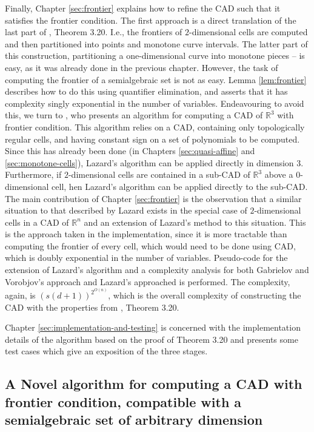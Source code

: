 \documentclass[
]{book}
\theoremstyle{definition}
\theoremstyle{definition}
\theoremstyle{definition}
\theoremstyle{definition}
\theoremstyle{remark}
\begin{document}
Finally, Chapter \ref{sec:frontier} explains how to refine the CAD such that it satisfies the frontier condition. The
first approach is a direct translation of the last part of \citet{bgv15}, Theorem 3.20. I.e., the frontiers of \(2\)-dimensional
cells are computed and then partitioned into points and monotone curve intervals. The latter part of this construction,
partitioning a one-dimensional curve into monotone pieces -- is easy, as it was already done in the previous chapter.
However, the task of computing the frontier of a semialgebraic set is not as easy. Lemma \ref{lem:frontier} describes how to do this using quantifier elimination, and asserts that it has complexity singly exponential in the number of variables.
Endeavouring to avoid this, we turn to \citet{lazard10}, who presents an algorithm for computing a CAD of \(\mathbb{R}^3\) with frontier condition. This algorithm relies on a CAD, containing only topologically regular cells, and having constant sign on a set of polynomials to be computed. Since this has already been done (in Chapters \ref{sec:quasi-affine} and \ref{sec:monotone-cells}), Lazard's algorithm can be applied directly in dimension \(3\). Furthermore, if \(2\)-dimensional cells are contained in a sub-CAD of \(\mathbb{R}^3\) above a \(0\)-dimensional cell, hen Lazard's algorithm can be applied directly to the sub-CAD.
The main contribution of Chapter \ref{sec:frontier} is the observation that a similar situation to that described by Lazard exists in the special case of \(2\)-dimensional cells in a CAD of \(\mathbb{R}^n\) and an extension of Lazard's method to this situation.
This is the approach taken in the implementation, since it is more tractable than computing the frontier of every cell, which would need to be done using CAD, which is doubly exponential in the number of variables.
Pseudo-code for the extension of Lazard's algorithm and a complexity analysis for both Gabrielov and Vorobjov's approach and Lazard's approached is performed. The complexity, again, is \(\left(s (d+1)\right)^{2^{O(n)}}\), which is the overall complexity of constructing the CAD with the properties from \citet{bgv15}, Theorem 3.20.

Chapter \ref{sec:implementation-and-testing} is concerned with the implementation details of the algorithm based on the proof of Theorem 3.20 and presents some test cases which give an exposition of the three stages.

\hypertarget{a-novel-algorithm-for-computing-a-cad-with-frontier-condition-compatible-with-a-semialgebraic-set-of-arbitrary-dimension}{%
\subsection{A Novel algorithm for computing a CAD with frontier condition, compatible with a semialgebraic set of arbitrary dimension}\label{a-novel-algorithm-for-computing-a-cad-with-frontier-condition-compatible-with-a-semialgebraic-set-of-arbitrary-dimension}}
\end{document}
